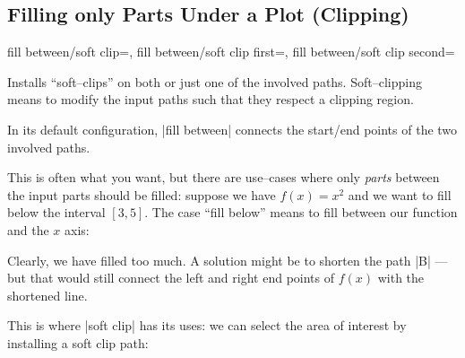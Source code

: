 \subsection{Filling only Parts Under a Plot (Clipping)}
\begin{tikzkeylist}{%
	fill between/soft clip=,%
	fill between/soft clip first=,%
	fill between/soft clip second=%
}
	
	Installs ``soft--clips'' on both or just one of the involved paths. Soft--clipping means to modify the input paths such that they respect a clipping region.

	In its default configuration, |fill between| connects the start/end points of the two involved paths.

	This is often what you want, but there are use--cases where only \emph{parts} between the input parts should be filled: suppose we have $f(x)=x^2$ and we want to fill below the interval $[3,5]$. The case ``fill below'' means to fill between our function and the $x$ axis:

\begin{codeexample}[]
\end{codeexample}
	\noindent Clearly, we have filled too much. A solution might be to shorten the path |B| --- but that would still connect the left and right end points of $f(x)$ with the shortened line.

	This is where |soft clip| has its uses: we can select the area of interest by installing a soft clip path:
\begin{codeexample}[]
\end{codeexample}
	

\end{tikzkeylist}
